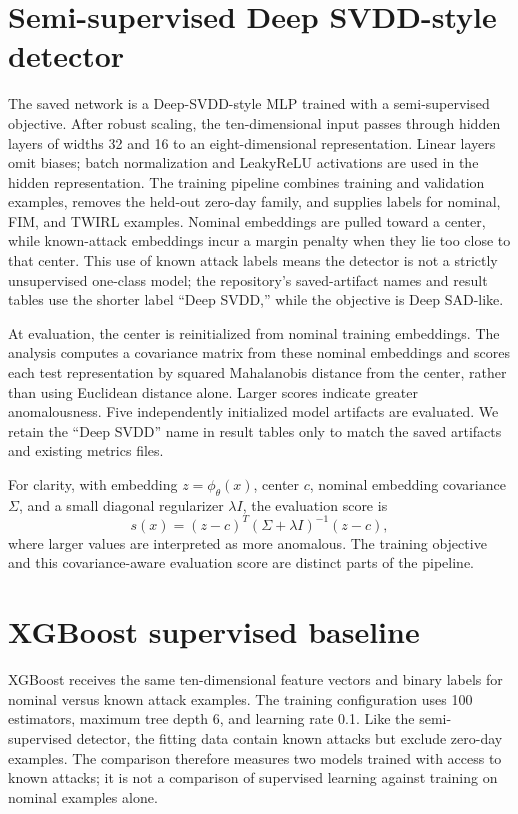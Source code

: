 \documentclass[12pt, a4paper]{report}
\begin{document}
\section{Semi-supervised Deep SVDD-style detector}
The saved network is a Deep-SVDD-style MLP trained with a semi-supervised objective. After robust scaling, the ten-dimensional input passes through hidden layers of widths 32 and 16 to an eight-dimensional representation. Linear layers omit biases; batch normalization and LeakyReLU activations are used in the hidden representation. The training pipeline combines training and validation examples, removes the held-out zero-day family, and supplies labels for nominal, FIM, and TWIRL examples. Nominal embeddings are pulled toward a center, while known-attack embeddings incur a margin penalty when they lie too close to that center. This use of known attack labels means the detector is not a strictly unsupervised one-class model; the repository's saved-artifact names and result tables use the shorter label ``Deep SVDD,'' while the objective is Deep SAD-like.

At evaluation, the center is reinitialized from nominal training embeddings. The analysis computes a covariance matrix from these nominal embeddings and scores each test representation by squared Mahalanobis distance from the center, rather than using Euclidean distance alone. Larger scores indicate greater anomalousness. Five independently initialized model artifacts are evaluated. We retain the ``Deep SVDD'' name in result tables only to match the saved artifacts and existing metrics files.

For clarity, with embedding $z=\phi_\theta(x)$, center $c$, nominal embedding covariance $\Sigma$, and a small diagonal regularizer $\lambda I$, the evaluation score is
\begin{equation}
s(x)=(z-c)^T(\Sigma+\lambda I)^{-1}(z-c),
\end{equation}
where larger values are interpreted as more anomalous. The training objective and this covariance-aware evaluation score are distinct parts of the pipeline.

\section{XGBoost supervised baseline}
XGBoost receives the same ten-dimensional feature vectors and binary labels for nominal versus known attack examples. The training configuration uses 100 estimators, maximum tree depth 6, and learning rate 0.1. Like the semi-supervised detector, the fitting data contain known attacks but exclude zero-day examples. The comparison therefore measures two models trained with access to known attacks; it is not a comparison of supervised learning against training on nominal examples alone.
\end{document}
